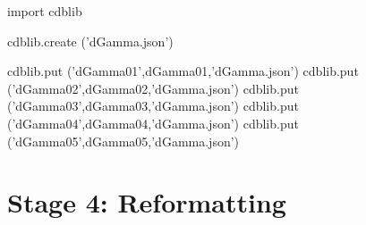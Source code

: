 \documentclass[12pt]{cdblatex}
\begin{document}
\clearpage

\begin{cadabra}
   import cdblib

   cdblib.create ('dGamma.json')

   cdblib.put ('dGamma01',dGamma01,'dGamma.json')
   cdblib.put ('dGamma02',dGamma02,'dGamma.json')
   cdblib.put ('dGamma03',dGamma03,'dGamma.json')
   cdblib.put ('dGamma04',dGamma04,'dGamma.json')
   cdblib.put ('dGamma05',dGamma05,'dGamma.json')

\end{cadabra}

\clearpage

\section*{Stage 4: Reformatting}
\end{document}
